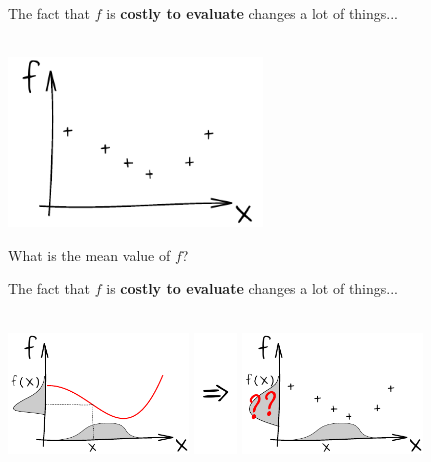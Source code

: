 \begin{frame}{}
The fact that $f$ is \textbf{costly to evaluate} changes a lot of things...\\
\vspace{5mm}
\\
\vspace{5mm}
\begin{center}
\includegraphics[height=4.5cm]{1_stat_models/figures/ink_fX}
\end{center}
What is the mean value of $f$?
\end{frame}

\begin{frame}{}
The fact that $f$ is \textbf{costly to evaluate} changes a lot of things...\\
\vspace{5mm}
\\
\vspace{5mm}
\begin{center}
\includegraphics[height=3.2cm]{1_stat_models/figures/ink_unprogf} \includegraphics[height=3.2cm]{1_stat_models/figures/Rightarrow} \includegraphics[height=3.2cm]{1_stat_models/figures/ink_unprogfX}
\end{center}
\end{frame}

